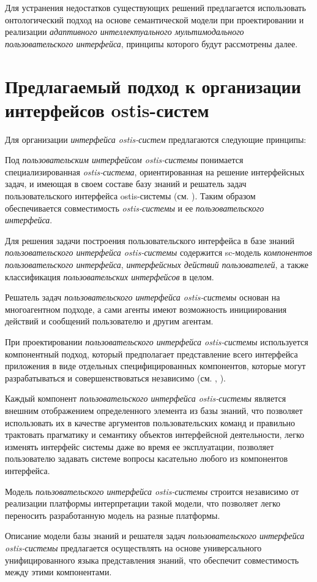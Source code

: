 Для устранения недостатков существующих решений предлагается использовать онтологический подход на основе семантической модели при проектировании и реализации \textit{адаптивного интеллектуального мультимодального пользовательского интерфейса}, принципы которого будут рассмотрены далее.

\section{Предлагаемый подход к организации интерфейсов ostis-систем}
\label{sec_proposed_ui_approach}

Для организации \textit{интерфейса ostis-систем} предлагаются следующие принципы:
\begin{textitemize}
	\item Под \textit{пользовательским интерфейсом ostis-системы} понимается специализированная
    \textit{ostis-система}, ориентированная на решение интерфейсных задач, и имеющая в своем составе базу знаний и решатель задач пользовательского интерфейса ostis-системы (см. ). Таким образом обеспечивается совместимость \textit{ostis-системы} и ее \textit{пользовательского интерфейса}.
	\item Для решения задачи построения пользовательского интерфейса в базе знаний \textit{пользовательского интерфейса ostis-системы} содержится sc-модель \textit{компонентов пользовательского интерфейса}, \textit{интерфейсных действий пользователей}, а также классификация \textit{пользовательских интерфейсов} в целом.
	\item Решатель задач \textit{пользовательского интерфейса ostis-системы} основан на многоагентном подходе, а сами агенты имеют возможность инициирования действий и сообщений пользователю и другим агентам.
	\item При проектировании \textit{пользовательского интерфейса ostis-системы} используется компонентный подход, который предполагает представление всего интерфейса приложения в виде отдельных специфицированных компонентов, которые могут разрабатываться и совершенствоваться независимо (см. , ).
	\item Каждый компонент \textit{пользовательского интерфейса ostis-системы} является внешним отображением определенного элемента из базы знаний, что позволяет использовать их в качестве аргументов пользовательских команд и правильно трактовать прагматику и семантику объектов интерфейсной деятельности, легко изменять интерфейс системы даже во время ее эксплуатации, позволяет пользователю задавать системе вопросы касательно любого из компонентов интерфейса.
	\item Модель \textit{пользовательского интерфейса ostis-системы} строится независимо от реализации платформы интерпретации такой модели, что позволяет легко переносить разработанную модель на разные платформы.
	\item Описание модели базы знаний и решателя задач \textit{пользовательского интерфейса ostis-системы} предлагается осуществлять на основе универсального унифицированного языка представления знаний, что обеспечит совместимость между этими компонентами.
\end{textitemize}

